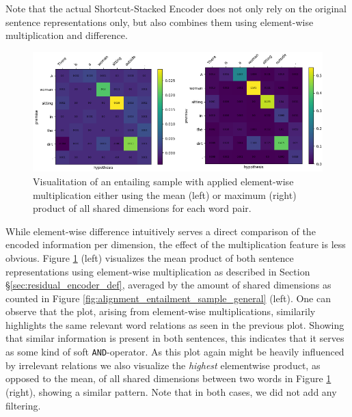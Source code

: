 \noindent
Note that the actual Shortcut-Stacked Encoder does not only rely on the original sentence representations only, but also combines them using element-wise multiplication and difference. 
\begin{figure}[tph!]
\centering
	\includegraphics[totalheight=7cm]{fig/alignment_entailment_sample_mult.png}
	\caption{Visualitation of an entailing sample with applied element-wise multiplication either using the mean (left) or maximum (right) product of all shared dimensions for each word pair.}
	\label{fig:alignment_entailment_sample_mult}
\end{figure}
While element-wise difference intuitively serves a direct comparison of the encoded information per dimension, the effect of the multiplication feature is less obvious. Figure \ref{fig:alignment_entailment_sample_mult} (left) visualizes the mean product of both sentence representations using element-wise multiplication as described in Section §\ref{sec:residual_encoder_def}, averaged by the amount of shared dimensions as counted in Figure \ref{fig:alignment_entailment_sample_general} (left). One can observe that the plot, arising from element-wise multiplications, similarily highlights the same relevant word relations as seen in the previous plot. Showing that similar information is present in both sentences, this indicates that it serves as some kind of soft \texttt{AND}-operator. As this plot again might be heavily influenced by irrelevant relations we also visualize the \textit{highest} elementwise product, as opposed to the mean, of all shared dimensions between two words in Figure \ref{fig:alignment_entailment_sample_mult} (right), showing a similar pattern. Note that in both cases, we did not add any filtering.

